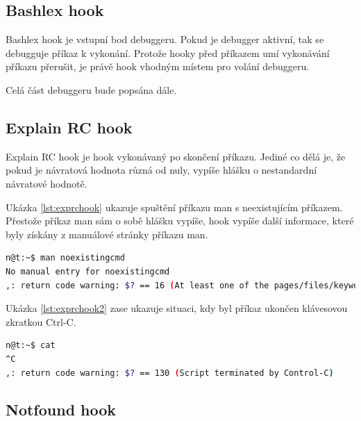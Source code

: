 \documentclass[thesis=M,czech]{FITthesis}[2012/06/26]
\begin{document}

\subsection{Bashlex hook}

Bashlex hook je vstupní bod debuggeru. Pokud je debugger aktivní, tak se debugguje příkaz k vykonání. Protože hooky před příkazem umí vykonávání příkazu přerušit, je právě hook vhodným místem pro volání debuggeru.

Celá část debuggeru bude popsána dále.

\subsection{Explain RC hook}

Explain RC hook je hook vykonávaný po skončení příkazu. Jediné co dělá je, že pokud je návratová hodnota různá od nuly, vypíše hlášku o nestandardní návratové hodnotě.

Ukázka \ref{lst:exprchook} ukazuje spuštění příkazu man s neexistujícím příkazem. Přestože příkaz man sám o sobě hlášku vypíše, hook vypíše další informace, které byly získány z manuálové stránky příkazu man.

\begin{minipage}{\linewidth}
\begin{lstlisting}[language=bash, caption={Explain RC hook}, label={lst:exprchook}]
n@t:~$ man noexistingcmd
No manual entry for noexistingcmd
,: return code warning: $? == 16 (At least one of the pages/files/keywords didn't exist or wasn't matched.)
\end{lstlisting}
\end{minipage}

Ukázka \ref{lst:exprchook2} zase ukazuje situaci, kdy byl příkaz ukončen klávesovou zkratkou Ctrl-C.

\begin{minipage}{\linewidth}
\begin{lstlisting}[language=bash, caption={Explain RC hook}, label={lst:exprchook2}]
n@t:~$ cat
^C
,: return code warning: $? == 130 (Script terminated by Control-C)
\end{lstlisting}
\end{minipage}


\subsection{Notfound hook}
\end{document}
